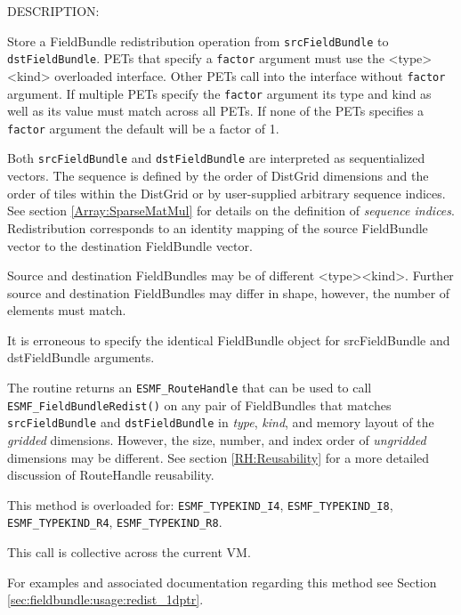 {\sf DESCRIPTION:\\ }


  
   Store a FieldBundle redistribution operation from {\tt srcFieldBundle} to {\tt dstFieldBundle}.
   PETs that
   specify a {\tt factor} argument must use the <type><kind> overloaded interface. Other
   PETs call into the interface without {\tt factor} argument. If multiple PETs specify
   the {\tt factor} argument its type and kind as well as its value must match across
   all PETs. If none of the PETs specifies a {\tt factor} argument the default will be a
   factor of 1.
  
   Both {\tt srcFieldBundle} and {\tt dstFieldBundle} are interpreted as sequentialized
   vectors. The
   sequence is defined by the order of DistGrid dimensions and the order of
   tiles within the DistGrid or by user-supplied arbitrary sequence indices. See
   section \ref{Array:SparseMatMul} for details on the definition of {\em sequence indices}.
   Redistribution corresponds to an identity mapping of the source FieldBundle vector to
   the destination FieldBundle vector.
  
   Source and destination FieldBundles may be of different <type><kind>. Further source
   and destination FieldBundles may differ in shape, however, the number of elements
   must match.
  
   It is erroneous to specify the identical FieldBundle object for srcFieldBundle
   and dstFieldBundle arguments.
  
   The routine returns an {\tt ESMF\_RouteHandle} that can be used to call
   {\tt ESMF\_FieldBundleRedist()} on any pair of FieldBundles that matches
   {\tt srcFieldBundle} and {\tt dstFieldBundle} in {\em type}, {\em kind},
   and memory layout of the {\em gridded} dimensions. However, the size,
   number, and index order of {\em ungridded} dimensions may be different.
   See section \ref{RH:Reusability} for a more detailed discussion of
   RouteHandle reusability.
  
   This method is overloaded for:\newline
   {\tt ESMF\_TYPEKIND\_I4}, {\tt ESMF\_TYPEKIND\_I8},\newline
   {\tt ESMF\_TYPEKIND\_R4}, {\tt ESMF\_TYPEKIND\_R8}.
   \newline
  
   This call is collective across the current VM.
  
   For examples and associated documentation regarding this method see Section
   \ref{sec:fieldbundle:usage:redist_1dptr}.
  
